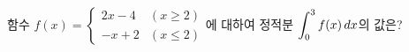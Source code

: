 함수 $f(x)=\begin{cases} 2x-4 & (x\ge 2) \\ -x+2 & (x\le 2) \end{cases}$에 대하여 정적분 $\displaystyle\int_{0}^{3} f(x)\mkern3mu dx$의 값은?

